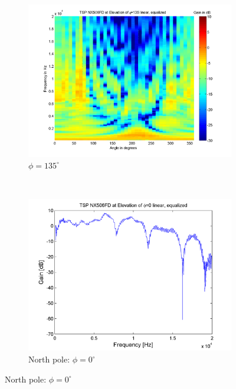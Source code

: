 \begin{figure}[t!]
        \begin{subfigure}[t]{0.5\textwidth}
			    \caption{$\phi=135^\circ$}
			    \label{fig:res_NX506_FD_135}
                \centering
    			\includegraphics[height=0.28\textheight]{afbeeldingen/plots/results/NX506FD_TSP_135_lin_eq.png}
        \end{subfigure}~
        \begin{subfigure}[t]{0.5\textwidth}
			    \caption{North pole: $\phi=0^\circ$}
			    \label{fig:res_NX506_FD_0}
                \centering
    			\includegraphics[height=0.28\textheight]{afbeeldingen/plots/results/NX506FD_north.png}
        \end{subfigure}
        

\end{figure}
